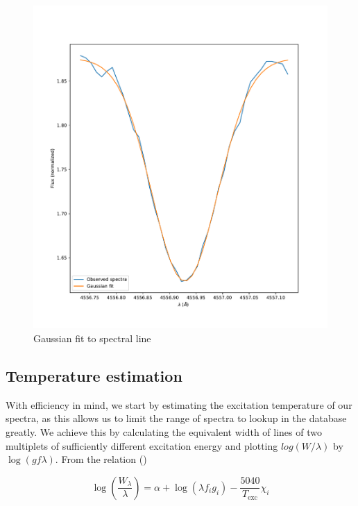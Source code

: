 \documentclass{aa}
\begin{document}
\begin{figure}
  \centering
  \includegraphics[width=\linewidth]{line_fit1.pdf}
  \caption{Gaussian fit to spectral line}
  \label{fig:line_fit}
\end{figure}


\subsection{Temperature estimation}
\label{sec:temp_estimation}

With efficiency in mind, we start by estimating the excitation temperature of our
spectra, as this allows us to limit the range of spectra to lookup in the
database greatly. We achieve this by calculating the equivalent width of lines
of two multiplets of sufficiently different excitation energy and plotting
$log \left(  W / \lambda \right)$ by $\log \left( g f \lambda \right)$. From the
relation (\cite{monteiro_sebenta_2019}) 

\begin{equation}
  \label{eq:log_W_relation}
  \log \left( \frac{W_\lambda}{\lambda} \right) = \alpha  + \log \left( \lambda f_i g_i \right) - \frac{5040}{T_{\text{exc}}} \chi_i
\end{equation}
\end{document}
